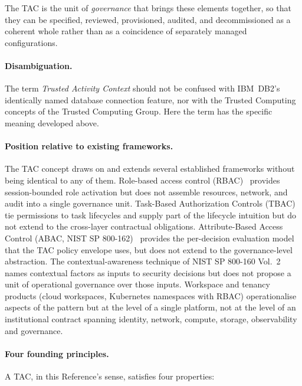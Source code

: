The TAC is the unit of \emph{governance} that brings these
elements together, so that they can be specified, reviewed,
provisioned, audited, and decommissioned as a coherent whole
rather than as a coincidence of separately managed
configurations.

\paragraph{Disambiguation.} The term \emph{Trusted Activity
Context} should not be confused with IBM~DB2's identically named
database connection feature, nor with the Trusted Computing
concepts of the Trusted Computing Group. Here the term has the
specific meaning developed above.

\paragraph{Position relative to existing frameworks.} The TAC
concept draws on and extends several established frameworks
without being identical to any of them. Role-based access
control (RBAC)~\cite{sandhu-rbac-1996} provides session-bounded
role activation but does not assemble resources, network, and
audit into a single governance unit. Task-Based Authorization
Controls (TBAC)~\cite{thomas-sandhu-tbac-1997} tie permissions to
task lifecycles and supply part of the lifecycle intuition but do
not extend to the cross-layer contractual obligations.
Attribute-Based Access Control (ABAC, NIST SP
800-162)~\cite{nist-sp800-162} provides the per-decision evaluation
model that the TAC policy envelope uses, but does not extend to
the governance-level abstraction. The contextual-awareness
technique of NIST SP 800-160 Vol.~2 names contextual factors as
inputs to security decisions but does not propose a unit of
operational governance over those inputs. Workspace and tenancy
products (cloud workspaces, Kubernetes namespaces with RBAC)
operationalise aspects of the pattern but at the level of a
single platform, not at the level of an institutional contract
spanning identity, network, compute, storage, observability and
governance.

\paragraph{Four founding principles.} A TAC, in this Reference's
sense, satisfies four properties:

